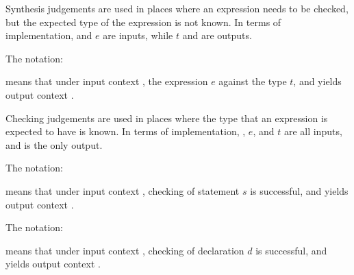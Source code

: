 \begin{Description}
Synthesis judgements are used in places where an expression needs to be checked, but the expected type of the expression is not known.
In terms of implementation, \ContextVarA and $e$ are inputs, while $t$ and \ContextVarB are outputs.
\end{Description}


The notation:
\begin{center}
\end{center}
means that under input context \ContextVarA, the expression $e$  against the type $t$, and yields output context \ContextVarB.

\begin{Description}
Checking judgements are used in places where the type that an expression is expected to have is known.
In terms of implementation, \ContextVarA, $e$, and $t$ are all inputs, and \ContextVarB is the only output.
\end{Description}



The notation:
\begin{center}
\end{center}
means that under input context \ContextVarA, checking of statement $s$ is successful, and yields output context \ContextVarB.


The notation:
\begin{center}
\end{center}
means that under input context \ContextVarA, checking of declaration $d$ is successful, and yields output context \ContextVarB.

